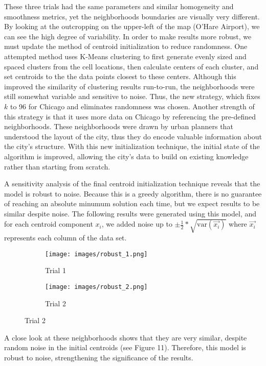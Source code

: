 \documentclass[times new roman,12pt]{article}
\begin{document}
These three trials had the same parameters and similar homogeneity and smoothness metrics, yet the neighborhoods boundaries are visually very different. By looking at the outcropping on the upper-left of the map (O'Hare Airport), we can see the high degree of variability. In order to make results more robust, we must update the method of centroid initialization to reduce randomness. One attempted method uses K-Means clustering to first generate evenly sized and spaced clusters from the cell locations, then calculate centers of each cluster, and set centroids to the the data points closest to these centers. Although this improved the similarity of clustering results run-to-run, the neighborhoods were still somewhat variable and sensitive to noise. Thus, the new strategy, which fixes $k$ to 96 for Chicago and eliminates randomness was chosen. Another strength of this strategy is that it uses more data on Chicago by referencing the pre-defined neighborhoods. These neighborhoods were drawn by urban planners that understood the layout of the city, thus they do encode valuable information about the city's structure. With this new initialization technique, the initial state of the algorithm is improved, allowing the city's data to build on existing knowledge rather than starting from scratch. 

A sensitivity analysis of the final centroid initialization technique reveals that the model is robust to noise. Because this is a greedy algorithm, there is no guarantee of reaching an absolute minumum solution each time, but we expect results to be similar despite noise. The following results were generated using this model, and for each centroid component $x_i$, we added noise up to $\pm \frac{1}{2}*\sqrt{\textrm{var}(\vec{x_i})}$ where $\vec{x_i}$ represents each column of the data set. 

\begin{figure}[H]
\centering
\caption{Final Model Sensitivity Analysis}
\begin{subfigure}[t]{.48\textwidth}
\centering
  \texttt{[image: images/robust\_1.png]}
  \caption{Trial 1}
  \label{fig:robust_1}
\end{subfigure}%
\begin{subfigure}[t]{.48\textwidth}
\centering
  \texttt{[image: images/robust\_2.png]}
  \caption{Trial 2}
  \label{fig:robust_2}
\end{subfigure}%
\end{figure}

A close look at these neighborhoods shows that they are very similar, despite random noise in the initial centroids (see Figure 11). Therefore, this model is robust to noise, strengthening the significance of the results.
\end{document}
